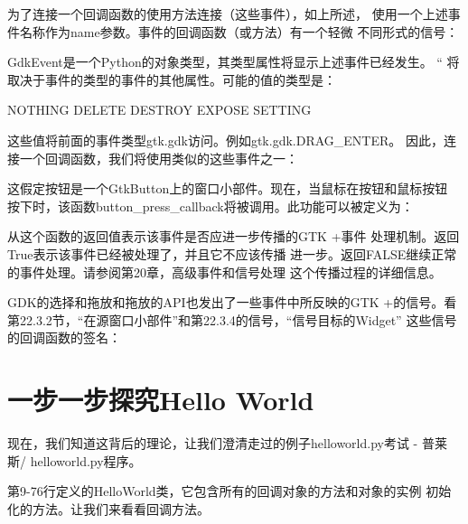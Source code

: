 为了连接一个回调函数的使用方法连接（这些事件），如上所述，
使用一个上述事件名称作为name参数。事件的回调函数（或方法）有一个轻微
不同形式的信号：


GdkEvent是一个Python的对象类型，其类型属性将显示上述事件已经发生。 “
将取决于事件的类型的事件的其他属性。可能的值的类型是：

NOTHING
DELETE
DESTROY
EXPOSE
SETTING

这些值将前面的事件类型gtk.gdk访问。例如gtk.gdk.DRAG\_ENTER。
因此，连接一个回调函数，我们将使用类似的这些事件之一：


这假定按钮是一个GtkButton上的窗口小部件。现在，当鼠标在按钮和鼠标按钮
按下时，该函数button\_press\_callback将被调用。此功能可以被定义为：


从这个函数的返回值表示该事件是否应进一步传播的GTK +事件
处理机制。返回True表示该事件已经被处理了，并且它不应该传播
进一步。返回FALSE继续正常的事件处理。请参阅第20章，高级事件和信号处理
这个传播过程的详细信息。


GDK的选择和拖放和拖放的API也发出了一些事件中所反映的GTK +的信号。看
第22.3.2节，“在源窗口小部件”和第22.3.4的信号，“信号目标的Widget”
这些信号的回调函数的签名：


	\section{一步一步探究Hello World}
现在，我们知道这背后的理论，让我们澄清走过的例子helloworld.py考试 - 
普莱斯/ helloworld.py程序。


第9-76行定义的HelloWorld类，它包含所有的回调对象的方法和对象的实例
初始化的方法。让我们来看看回调方法。



